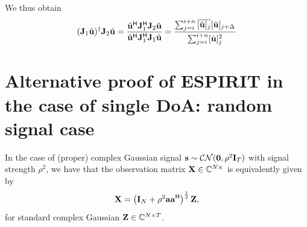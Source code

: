 \documentclass[11pt,a4paper]{article}
\begin{document}
We thus obtain
\begin{equation}
	({\mathbf{J}}_1 \hat {\mathbf{u}})^\dagger {\mathbf{J}}_2 \hat {\mathbf{u}} = \frac{\hat {\mathbf{u}}^{\sf H} {\mathbf{J}}_1^{\sf H} {\mathbf{J}}_2 \hat {\mathbf{u}}}{\hat {\mathbf{u}}^{\sf H} {\mathbf{J}}_1^{\sf H} {\mathbf{J}}_1 \hat {\mathbf{u}}} =  \frac{ \sum_{j=i}^{i+n} \overline{[\hat{\mathbf{u}}]_j} [\hat {\mathbf{u}}]_{j+\Delta} }{ \sum_{j=i}^{i+n} [\hat {\mathbf{u}}]_j^2 }
\end{equation}

\section{Alternative proof of ESPIRIT in the case of single DoA: random signal case}

In the case of (proper) complex Gaussian signal $\mathbf{s} \sim \mathcal{CN}(\mathbf{0}, \rho^2 \mathbf{I}_T)$ with signal strength $\rho^2$, we have that the observation matrix ${\mathbf{X}} \in {\mathbb{C}}^{N \times}$ is equivalently given by
\begin{equation}
	{\mathbf{X}} = \left(\mathbf{I}_N + \rho^2 \mathbf{a} \mathbf{a}^{\sf H} \right)^{\frac12} {\mathbf{Z}},
\end{equation}
for standard complex Gaussian ${\mathbf{Z}} \in {\mathbb{C}}^{N \times T}$.
\end{document}

